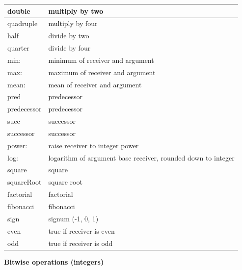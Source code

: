 \documentclass[letterpaper,10pt,english]{sphinxmanual}
\begin{document}
\begin{longtable}{p{5cm} p{10cm}}
double
 & 
multiply by two
\\\hline

quadruple
 & 
multiply by four
\\\hline

half
 & 
divide by two
\\\hline

quarter
 & 
divide by four
\\\hline

min:
 & 
minimum of receiver and argument
\\\hline

max:
 & 
maximum of receiver and argument
\\\hline

mean:
 & 
mean of receiver and argument
\\\hline

pred
 & 
predecessor
\\\hline

predecessor
 & 
predecessor
\\\hline

succ
 & 
successor
\\\hline

successor
 & 
successor
\\\hline

power:
 & 
raise receiver to integer power
\\\hline

log:
 & 
logarithm of argument base receiver, rounded down to integer
\\\hline

square
 & 
square
\\\hline

squareRoot
 & 
square root
\\\hline

factorial
 & 
factorial
\\\hline

fibonacci
 & 
fibonacci
\\\hline

sign
 & 
signum (-1, 0, 1)
\\\hline

even
 & 
true if receiver is even
\\\hline

odd
 & 
true if receiver is odd
\\\hline
\end{longtable}


\textbf{Bitwise operations (integers)}
\end{document}
